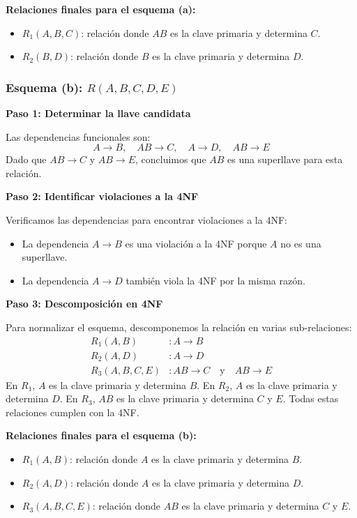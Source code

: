 \textbf{Relaciones finales para el esquema (a):}
\begin{itemize}
	\item \( R_1(A, B, C) \): relación donde \( AB \) es la clave primaria y determina \( C \).
	\item \( R_2(B, D) \): relación donde \( B \) es la clave primaria y determina \( D \).
\end{itemize}

\subsubsection*{Esquema (b): \( R(A, B, C, D, E) \)}

\textbf{Paso 1: Determinar la llave candidata}

Las dependencias funcionales son:
\[
A \rightarrow B, \quad AB \rightarrow C, \quad A \rightarrow D, \quad AB \rightarrow E
\]
Dado que \( AB \rightarrow C \) y \( AB \rightarrow E \), concluimos que \( AB \) es una superllave para esta relación.

\textbf{Paso 2: Identificar violaciones a la 4NF}

Verificamos las dependencias para encontrar violaciones a la 4NF:
\begin{itemize}
	\item La dependencia \( A \rightarrow B \) es una violación a la 4NF porque \( A \) no es una superllave.
	\item La dependencia \( A \rightarrow D \) también viola la 4NF por la misma razón.
\end{itemize}

\textbf{Paso 3: Descomposición en 4NF}

Para normalizar el esquema, descomponemos la relación en varias sub-relaciones:
\begin{align*}
	R_1(A, B) & : A \rightarrow B \\
	R_2(A, D) & : A \rightarrow D \\
	R_3(A, B, C, E) & : AB \rightarrow C \quad \text{y} \quad AB \rightarrow E
\end{align*}
En \( R_1 \), \( A \) es la clave primaria y determina \( B \). En \( R_2 \), \( A \) es la clave primaria y determina \( D \). En \( R_3 \), \( AB \) es la clave primaria y determina \( C \) y \( E \). Todas estas relaciones cumplen con la 4NF.

\textbf{Relaciones finales para el esquema (b):}
\begin{itemize}
	\item \( R_1(A, B) \): relación donde \( A \) es la clave primaria y determina \( B \).
	\item \( R_2(A, D) \): relación donde \( A \) es la clave primaria y determina \( D \).
	\item \( R_3(A, B, C, E) \): relación donde \( AB \) es la clave primaria y determina \( C \) y \( E \).
\end{itemize}